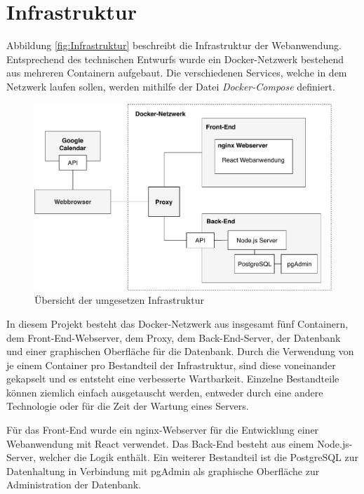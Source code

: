 \section{Infrastruktur}
Abbildung \vref{fig:Infrastruktur} beschreibt die Infrastruktur der Webanwendung. Entsprechend des technischen Entwurfs wurde ein Docker-Netzwerk bestehend aus mehreren Containern aufgebaut.
Die verschiedenen Services, welche in dem Netzwerk laufen sollen, werden mithilfe der Datei \textit{Docker-Compose} definiert.

\begin{figure}[h]
	\centering 
	\includegraphics[width=\textwidth]{img/ImplementierungInfrastruktur.pdf}
	\caption[Übersicht der umgesetzen Infrastruktur]{\label{fig:Infrastruktur}Übersicht der umgesetzen Infrastruktur}
\end{figure}

In diesem Projekt besteht das Docker-Netzwerk aus insgesamt fünf Containern, dem Front-End-Webserver, dem Proxy, dem Back-End-Server, der Datenbank und einer graphischen Oberfläche für die Datenbank.
Durch die Verwendung von je einem Container pro Bestandteil der Infrastruktur, sind diese voneinander gekapselt und es entsteht eine verbesserte Wartbarkeit.
Einzelne Bestandteile können ziemlich einfach ausgetauscht werden, entweder durch eine andere Technologie oder für die Zeit der Wartung eines Servers.

Für das Front-End wurde ein nginx-Webserver für die Entwicklung einer Webanwendung mit React verwendet.
Das Back-End besteht aus einem Node.js-Server, welcher die Logik enthält.
Ein weiterer Bestandteil ist die PostgreSQL zur Datenhaltung in Verbindung mit pgAdmin als graphische Oberfläche zur Administration der Datenbank. 

